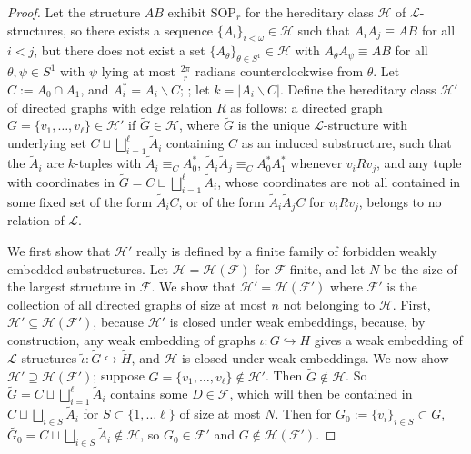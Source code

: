 \documentclass{amsart}
\theoremstyle{definition}
\theoremstyle{remark}
\numberwithin{equation}{section}
\begin{document}
\begin{proof}
    Let the structure $AB$ exhibit $\mathrm{SOP}_{r}$ for the hereditary class $\mathcal{H}$ of $\mathcal{L}$-structures, so there exists a sequence $\{ A_{i}\}_{i < \omega} \in \mathcal{H}$ such that $A_{i}A_{j} \equiv AB$ for all $i < j$, but there does not exist a set $\{ A_{\theta}\}_{\theta \in S^{1}} \in \mathcal{H}$ with $A_{\theta}A_{\psi} \equiv AB$ for all $\theta, \psi \in S^{1}$ with $\psi$ lying at most $\frac{2\pi}{r}$ radians counterclockwise from $\theta$. Let $C := A_{0} \cap A_{1}$, and $A^{*}_{i} = A_{i} \backslash C$; ; let $k = |A_{i} \backslash C|$. Define the hereditary class $\mathcal{H}'$ of directed graphs with edge relation $R$ as follows: a directed graph $G = \{v_{1}, \ldots, v_{\ell}\} \in \mathcal{H}'$ if $\tilde{G} \in \mathcal{H}$, where $\tilde{G}$ is the unique $\mathcal{L}$-structure with underlying set $C \sqcup \bigsqcup^{\ell}_{i=1} \tilde{A}_{i}$ containing $C$ as an induced substructure, such that the $\tilde{A}_{i}$ are $k$-tuples with $\tilde{A}_{i} \equiv_{C} A^{*}_{0}$, $\tilde{A}_{i}\tilde{A}_{j} \equiv_{C} A^{*}_{0} A^{*}_{1}$ whenever $v_{i} R v_{j}$, and any tuple with coordinates in $\tilde{G} = C \sqcup \bigsqcup^{\ell}_{i=1} \tilde{A}_{i}$, whose coordinates are not all contained in some fixed set of the form $\tilde{A}_{i} C$, or of the form $\tilde{A}_{i} \tilde{A}_{j} C$ for $v_{i} R v_{j}$, belongs to no relation of $\mathcal{L}$.

    We first show that $\mathcal{H}'$ really is defined by a finite family of forbidden weakly embedded substructures. Let $\mathcal{H} = \mathcal{H}(\mathcal{F})$ for $\mathcal{F}$ finite, and let $N$ be the size of the largest structure in $\mathcal{F}$. We show that $\mathcal{H}' = \mathcal{H}(\mathcal{F}')$ where $\mathcal{F}'$ is the collection of all directed graphs of size at most $n$ not belonging to $\mathcal{H}$. First, $\mathcal{H}' \subseteq \mathcal{H}(\mathcal{F}')$, because $\mathcal{H}'$ is closed under weak embeddings, because, by construction, any weak embedding of graphs $\iota: G \hookrightarrow H$ gives a weak embedding of $\mathcal{L}$-structures $\tilde{\iota}: \tilde{G} \hookrightarrow \tilde{H}$, and $\mathcal{H}$ is closed under weak embeddings. We now show $\mathcal{H}' \supseteq \mathcal{H}(\mathcal{F}')$; suppose $G= \{v_{1}, \ldots, v_{\ell}\} \notin \mathcal{H}'$. Then $\tilde{G} \notin \mathcal{H}$. So $\tilde{G}= C \sqcup \bigsqcup^{\ell}_{i=1} \tilde{A}_{i}$ contains some $D \in \mathcal{F}$, which will then be contained in $C \sqcup \bigsqcup_{i \in S} \tilde{A}_{i}$ for $S \subset \{1, \ldots \ell\}$ of size at most $N$. Then for $G_{0} := \{v_{i}\}_{i \in S} \subset G$, $\tilde{G_{0}} = C \sqcup \bigsqcup_{i \in S} \tilde{A}_{i} \notin \mathcal{H}$, so $G_{0} \in \mathcal{F}'$ and $G \notin \mathcal{H}(\mathcal{F}')$.


\end{proof}
\end{document}
